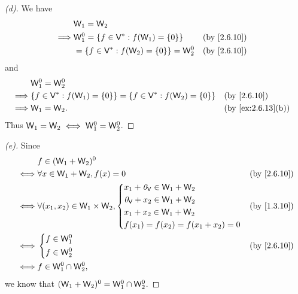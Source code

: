 \begin{proof}[(d)]
  We have
  \begin{align*}
             & \W_1 = \W_2                                                                    \\
    \implies & \W_1^0 = \set{f \in \V^* : f(\W_1) = \set{0}}   &  & \text{(by \cref{2.6.10})} \\
             & = \set{f \in \V^* : f(\W_2) = \set{0}} = \W_2^0 &  & \text{(by \cref{2.6.10})} \\
  \end{align*}
  and
  \begin{align*}
             & \W_1^0 = \W_2^0                                                                                                  \\
    \implies & \set{f \in \V^* : f(\W_1) = \set{0}} = \set{f \in \V^* : f(\W_2) = \set{0}} &  & \text{(by \cref{2.6.10})}       \\
    \implies & \W_1 = \W_2.                                                                &  & \text{(by \cref{ex:2.6.13}(b))}
  \end{align*}
  Thus \(\mathsf{W}_1 = \mathsf{W}_2 \iff \mathsf{W}_1^0 = \mathsf{W}_2^0\).
\end{proof}

\begin{proof}[(e)]
  Since
  \begin{align*}
         & f \in (\W_1 + \W_2)^0                                                                  \\
    \iff & \forall x \in \W_1 + \W_2, f(x) = 0                     &  & \text{(by \cref{2.6.10})} \\
    \iff & \forall (x_1, x_2) \in \W_1 \times \W_2, \begin{dcases}
                                                      x_1 + \zv_{\V} \in \W_1 + \W_2 \\
                                                      \zv_{\V} + x_2 \in \W_1 + \W_2 \\
                                                      x_1 + x_2 \in \W_1 + \W_2      \\
                                                      f(x_1) = f(x_2) = f(x_1 + x_2) = 0
                                                    \end{dcases} &  & \text{(by \cref{1.3.10})}   \\
    \iff & \begin{dcases}
             f \in \W_1^0 \\
             f \in \W_2^0
           \end{dcases}                                         &  & \text{(by \cref{2.6.10})}    \\
    \iff & f \in \W_1^0 \cap \W_2^0,
  \end{align*}
  we know that \((\mathsf{W}_1 + \mathsf{W}_2)^0 = \mathsf{W}_1^0 \cap \mathsf{W}_2^0\).
\end{proof}

